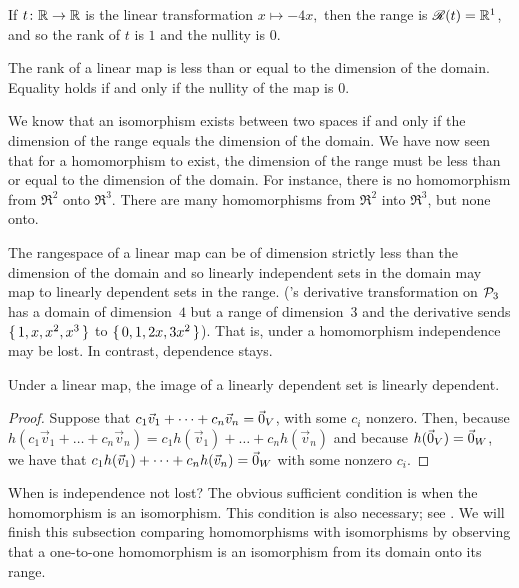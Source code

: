 \begin{example}
If \( \mbox{$t\colon \mathbb{R}\to \mathbb{R}$} \) is the linear transformation \( x\mapsto -4x, \)
then the range is \(  \mathscr{R}(t)=\mathbb{R}^1 \), and so 
the rank of $t$ is $1$ and the nullity is $0$.
\end{example}

\begin{corollary}
\label{cor:RankDecreases}
The rank of a linear map is less than or equal to the dimension of the domain.
Equality holds if and only if the nullity of the map is $0$.
\end{corollary}

We  know 
that an isomorphism exists between two spaces 
if and only if the dimension of the range equals the dimension of the domain.
We have now seen that for a homomorphism to exist,  
the dimension of the range must be less than or equal to the 
dimension of the domain.
For instance, there is no homomorphism
from \( \Re^2 \) onto \( \Re^3 \).
There are many homomorphisms
from \( \Re^2 \) into \( \Re^3 \), but none onto.

The rangespace of a linear map can be of dimension strictly less than 
the dimension of the domain
and so
linearly independent sets in the domain
may map to linearly dependent sets in the range.
('s derivative transformation on $\mathcal{P}_3$
has a domain of dimension~$4$ but a range of dimension~$3$
and the derivative sends
$\mbox{$\{\,1,x,x^2,x^3\,\}$}$ to $\mbox{$\{\,0,1,2x,3x^2\,\}$}$).
That is, under a homomorphism independence may be lost.
In contrast, dependence stays.

\begin{lemma}
Under a linear map, the image of a linearly dependent set is linearly
dependent.
\end{lemma}

\begin{proof}
Suppose that \( c_1\vec{v}_1+\dots+c_n\vec{v}_n=\vec{0}_V \),
with some $c_i$ nonzero.
Then, because
\( h(c_1\vec{v}_1+\dots+c_n\vec{v}_n)=c_1h(\vec{v}_1)+\dots+c_nh(\vec{v}_n) \)
and because \( h(\vec{0}_V)=\vec{0}_W \),
we have that $c_1h(\vec{v}_1)+\dots+c_nh(\vec{v}_n)=\vec{0}_W$ with some nonzero 
$c_i$.
\end{proof}

When is independence not lost?
The obvious sufficient condition is when the homomorphism is an isomorphism.
This condition is also necessary; 
see .
We will finish this subsection comparing homomorphisms with isomorphisms 
by observing that
a one-to-one homomorphism is an isomorphism from its domain onto its range.

